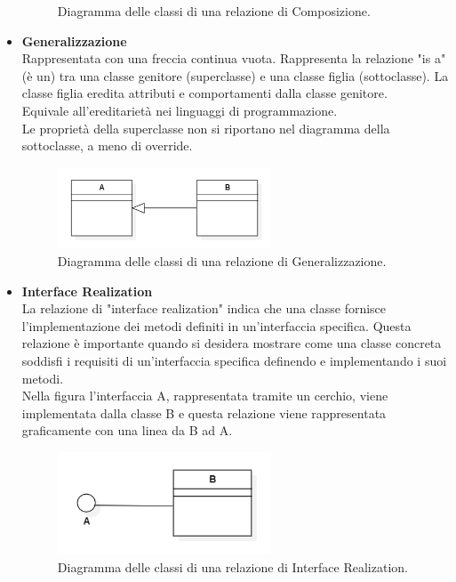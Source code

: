 \begin{itemize}
\begin{figure}[H]
        \caption{Diagramma delle classi di una relazione di Composizione.}
    \end{figure}
    \item \textbf{Generalizzazione} \\
    Rappresentata con una freccia continua vuota. Rappresenta la relazione "is a" (è un) tra una classe genitore (superclasse) e una classe figlia (sottoclasse). La classe figlia eredita attributi e comportamenti dalla classe genitore. \\
    Equivale all'ereditarietà nei linguaggi di programmazione. \\
    Le proprietà della superclasse non si riportano nel diagramma della sottoclasse, a meno di override.
    \begin{figure}[H]
        \centering
        \includegraphics[width=0.6\textwidth]{../Images/NormeDiProgetto/ClassDiagram_Generalizzazione.PNG}
        \caption{Diagramma delle classi di una relazione di Generalizzazione.}
    \end{figure}
    \item \textbf{Interface Realization} \\
    La relazione di "interface realization" indica che una classe fornisce l'implementazione dei metodi definiti in un'interfaccia specifica. Questa relazione è importante quando si desidera mostrare come una classe concreta soddisfi i requisiti di un'interfaccia specifica definendo e implementando i suoi metodi. \\
    Nella figura l'interfaccia A, rappresentata tramite un cerchio, viene implementata dalla classe B e questa relazione viene rappresentata graficamente con una linea da B ad A.
    \begin{figure}[H]
        \centering
        \includegraphics[width=0.6\textwidth]{../Images/NormeDiProgetto/InterfaceRealization.PNG}
        \caption{Diagramma delle classi di una relazione di Interface Realization.}
    \end{figure}
\end{itemize}

